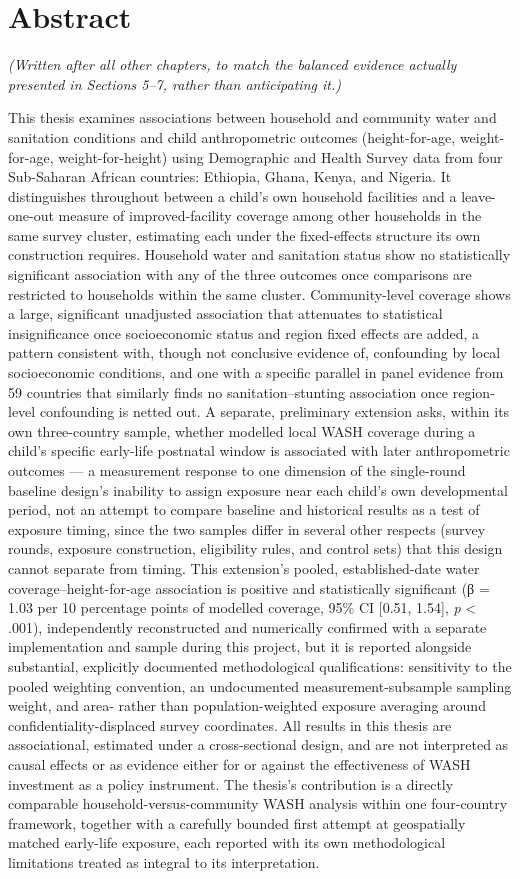 \section*{Abstract}

\textit{(Written after all other chapters, to match the balanced evidence actually presented in Sections 5--7, rather than anticipating it.)}

This thesis examines associations between household and community water and sanitation conditions and child anthropometric outcomes (height-for-age, weight-for-age, weight-for-height) using Demographic and Health Survey data from four Sub-Saharan African countries: Ethiopia, Ghana, Kenya, and Nigeria. It distinguishes throughout between a child's own household facilities and a leave-one-out measure of improved-facility coverage among other households in the same survey cluster, estimating each under the fixed-effects structure its own construction requires. Household water and sanitation status show no statistically significant association with any of the three outcomes once comparisons are restricted to households within the same cluster. Community-level coverage shows a large, significant unadjusted association that attenuates to statistical insignificance once socioeconomic status and region fixed effects are added, a pattern consistent with, though not conclusive evidence of, confounding by local socioeconomic conditions, and one with a specific parallel in panel evidence from 59 countries that similarly finds no sanitation--stunting association once region-level confounding is netted out. A separate, preliminary extension asks, within its own three-country sample, whether modelled local WASH coverage during a child's specific early-life postnatal window is associated with later anthropometric outcomes --- a measurement response to one dimension of the single-round baseline design's inability to assign exposure near each child's own developmental period, not an attempt to compare baseline and historical results as a test of exposure timing, since the two samples differ in several other respects (survey rounds, exposure construction, eligibility rules, and control sets) that this design cannot separate from timing. This extension's pooled, established-date water coverage--height-for-age association is positive and statistically significant (β = 1.03 per 10 percentage points of modelled coverage, 95\% CI [0.51, 1.54], \textit{p} < .001), independently reconstructed and numerically confirmed with a separate implementation and sample during this project, but it is reported alongside substantial, explicitly documented methodological qualifications: sensitivity to the pooled weighting convention, an undocumented measurement-subsample sampling weight, and area- rather than population-weighted exposure averaging around confidentiality-displaced survey coordinates. All results in this thesis are associational, estimated under a cross-sectional design, and are not interpreted as causal effects or as evidence either for or against the effectiveness of WASH investment as a policy instrument. The thesis's contribution is a directly comparable household-versus-community WASH analysis within one four-country framework, together with a carefully bounded first attempt at geospatially matched early-life exposure, each reported with its own methodological limitations treated as integral to its interpretation.

